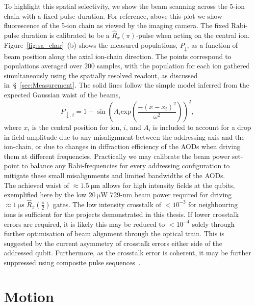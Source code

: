 To highlight this spatial selectivity, we show the beam scanning across the 5-ion chain with a fixed pulse duration.
For reference, above this plot we show fluorescence of the 5-ion chain as viewed by the imaging camera. 
The fixed Rabi-pulse duration is calibrated to be a $\hat R_x(\pi)$-pulse when acting
on the central ion. Figure~\ref{fig:sa_char}~(b) shows the measured populations,
$P_\downarrow$, as a function of beam position along the axial ion-chain
direction. The points correspond to populations averaged over $200$ samples,
with the population for each ion gathered simultaneously using the spatially
resolved readout, as discussed in~\S~\ref{sec:Measurement}. The solid lines
follow the simple model inferred from the expected Gaussian waist of the beams, 
\begin{equation}
P_{\downarrow,i} = 1 - \sin\left(A_i\mathrm{exp}\left(\frac{-(x - x_i)^2} {\omega^2}\right)\right)^ 2,
\end{equation}
where $x_i$ is the central position for ion, $i$, and $A_i$ is included to account for a drop in field amplitude due to any
misalignment between the addressing axis and the ion-chain, or due to changes in
diffraction efficiency of the AODs when driving them at different frequencies.
Practically we may calibrate the beam power set-point to balance any
Rabi-frequencies for every addressing configuration to mitigate these small
misalignments and limited bandwidths of the AODs.\\

The achieved waist of $\approx 1.5~\unit{\micro\meter}$ allows for high
intensity fields at the qubits, exemplified here by the low
$20~\unit{\micro\watt}$ 729-nm beam power required for driving $\approx
1~\unit{\micro\second}$ $\hat R_x(\frac{\pi}{2})$ gates. The low intensity crosstalk
of $<10^{-3}$ for neighbouring ions is sufficient for the projects demonstrated
in this thesis. If lower crosstalk errors are required, it is likely this may be
reduced to $<10^{-4}$ solely through further optimisation of beam alignment
through the optical train. This is suggested by the current asymmetry of
crosstalk errors either side of the addressed qubit. Furthermore, as the
crosstalk error is coherent, it may be further suppressed using composite pulse
sequences~\cite{fang_crosstalk_2022}.

\section{Motion}
\label{sec:Motion}


